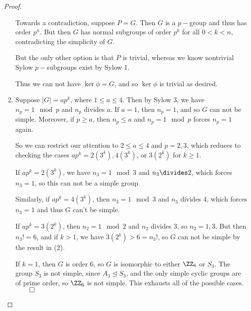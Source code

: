 \begin{proof}
\begin{enumerate}
    Towards a contradiction, suppose $P = G$. Then $G$ is a $p-$group and thus has order $p^n$. But then $G$ has normal subgroups of order $p^k$ for all $0 < k < n$, contradicting the simplicity of $G$.
    
    But the only other option is that $P$ is trivial, whereas we know nontrivial Sylow $p-$subgroups exist by Sylow 1. 
    
    Thus we can not have $\ker \phi = G$, and so $\ker \phi$ is trivial as desired.

    \item Suppose $\left| G \right| = ap^k$, where $1 \leq a \leq 4$. Then by Sylow 3, we have $n_p = 1 \mod p$ and $n_p$ divides $a$. If $a=1$, then $n_p = 1$, and so $G$ can not be simple. Moreover, if $p \geq a$, then $n_p \leq a$ and $n_p = 1\mod p$ forces $n_p = 1$ again. 
    
    So we can restrict our attention to $2 \leq a \leq 4$ and $p = 2, 3$, which reduces to checking the cases $ap^k = 2 (3^k), 4 (3^k)$, or $3 (2^k)$ for  $k\geq 1$.
    
    If $ap^k = 2(3^k)$, we have $n_3 = 1 \mod 3$ and $n_3 \divides 2$, which forces $n_3 = 1$, so this can not be a simple group.
    
    Similarly, if $ap^k = 4(3^k)$, then $n_3 = 1 \mod 3$ and $n_3$ divides 4, which forces $n_3 = 1$ and thus $G$ can't be simple.
    
    If $ap^k = 3(2^k)$, then $n_2 = 1 \mod 2$ and $n_2$ divides 3, so $n_2 = 1, 3$. But then $n_3! = 6$, and if $k > 1$, we have $3(2^k) > 6 = n_3!$, so $G$ can not be simple by the result in (2). 
    
    If $k = 1$, then $G$ is order 6, so $G$ is isomorphic to either $\ZZ_6$ or $S_3$. The group $S_3$ is not simple, since $A_3 \trianglelefteq S_3$, and the only simple cyclic groups are of prime order, so $\ZZ_6$ is not simple. This exhausts all of the possible cases. $\qed$
\end{enumerate}
\end{proof}


